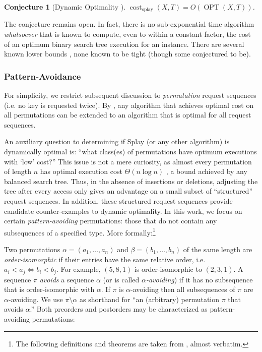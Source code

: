 \documentclass{article}
\theoremstyle{plain}
\newtheorem{conjecture}{Conjecture}
\theoremstyle{definition}
\begin{document}
%
\begin{conjecture}[Dynamic Optimality \cite{SPLAY_JOURNAL}]
$\operatorname{cost}_{\text{splay}}(X,T)=O(\operatorname{OPT}(X,T))$.
\end{conjecture}

%
The conjecture remains open. In fact, there is no sub-exponential time
algorithm \emph{whatsoever} that is known to compute, even to within a constant
factor, the cost of an optimum binary search tree execution for an instance.
There are several known lower bounds \cite{GEOMETRY,WILBER}, none known to be
tight (though some conjectured to be).

\subsubsection*{Pattern-Avoidance}

%
For simplicity, we restrict subsequent discussion to \emph{permutation} request
sequences (i.e. no key is requested twice). By \cite{PATTERN_AVOIDANCE}, any
algorithm that achieves optimal cost on all permutations can be extended to an
algorithm that is optimal for all request sequences.

%
An auxiliary question to determining if Splay (or any other algorithm) is
dynamically optimal is: ``what class(es) of permutations have optimum
executions with `low' cost?'' This issue is not a mere curiosity, as almost
every permutation of length $n$ has optimal execution cost $\Theta(n\log n)$
\cite{BST_EXECUTION_ENCODINGS}, a bound achieved by any balanced search tree.
Thus, in the absence of insertions or deletions, adjusting the tree after every
access only gives an advantage on a small subset of ``structured'' request
sequences. In addition, these structured request sequences provide candidate
counter-examples to dynamic optimality. In this work, we focus on certain
\emph{pattern-avoiding} permutations: those that do not contain any
subsequences of a specified type. More formally:\footnote{The following
definitions and theorems are taken from \cite[Chapter 1.3]{KOZMA_THESIS},
almost verbatim.}

%
 Two permutations $\alpha=(a_1,\dots, a_n)$ and
$\beta=(b_1,\dots, b_n)$ of the same length are \emph{order-isomorphic}
if their entries have the same relative order, i.e. $a_i<a_j\iff
b_i<b_j$. For example, $(5,8,1)$ is order-isomorphic to $(2,3,1)$. A
sequence $\pi$ \emph{avoids} a sequence $\alpha$ (or is called
\emph{$\alpha$-avoiding}) if it has no subsequence that is order-isomorphic
with $\alpha$. If $\pi$ is $\alpha$-avoiding then all subsequences of $\pi$ are
$\alpha$-avoiding. We use $\pi\setminus\alpha$ as shorthand for ``an
(arbitrary) permutation $\pi$ that avoids $\alpha$.'' Both preorders and
postorders may be characterized as pattern-avoiding permutations:
\end{document}
